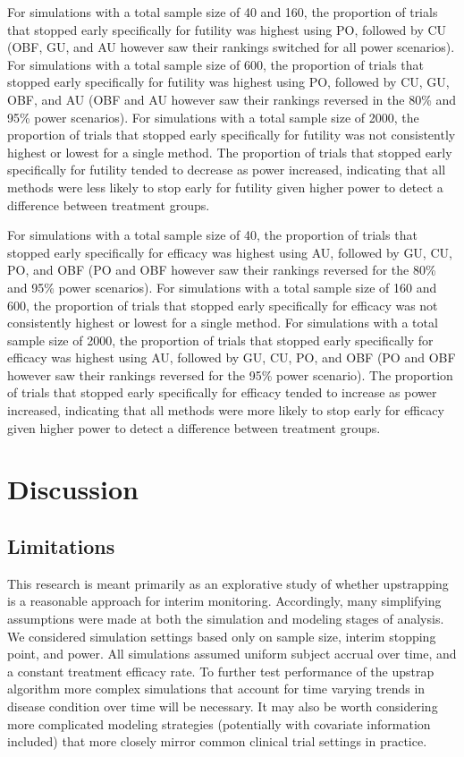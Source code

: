 \documentclass[Afour,sageh,times,square,numbers]{sagej}
\begin{document}
For simulations with a total sample size of 40 and 160, the proportion of trials that stopped early specifically for futility was highest using PO, followed by CU (OBF, GU, and AU however saw their rankings switched for all power scenarios).  For simulations with a total sample size of 600, the proportion of trials that stopped early specifically for futility was highest using PO, followed by CU, GU, OBF, and AU (OBF and AU however saw their rankings reversed in the 80\% and 95\% power scenarios).  For simulations with a total sample size of 2000, the proportion of trials that stopped early specifically for futility was not consistently highest or lowest for a single method.  The proportion of trials that stopped early specifically for futility tended to decrease as power increased, indicating that all methods were less likely to stop early for futility given higher power to detect a difference between treatment groups.

For simulations with a total sample size of 40, the proportion of trials that stopped early specifically for efficacy was highest using AU, followed by GU, CU, PO, and OBF (PO and OBF however saw their rankings reversed for the 80\% and 95\% power scenarios).  For simulations with a total sample size of 160 and 600, the proportion of trials that stopped early specifically for efficacy was not consistently highest or lowest for a single method.  For simulations with a total sample size of 2000, the proportion of trials that stopped early specifically for efficacy was highest using AU, followed by GU, CU, PO, and OBF (PO and OBF however saw their rankings reversed for the 95\% power scenario).  The proportion of trials that stopped early specifically for efficacy tended to increase as power increased, indicating that all methods were more likely to stop early for efficacy given higher power to detect a difference between treatment groups.

\section{Discussion}

\subsection{Limitations}

This research is meant primarily as an explorative study of whether upstrapping is a reasonable approach for interim monitoring.  Accordingly, many simplifying assumptions were made at both the simulation and modeling stages of analysis.  We considered simulation settings based only on sample size, interim stopping point, and power.  All simulations assumed uniform subject accrual over time, and a constant treatment efficacy rate.  To further test performance of the upstrap algorithm more complex simulations that account for time varying trends in disease condition over time will be necessary.  It may also be worth considering more complicated modeling strategies (potentially with covariate information included) that more closely mirror common clinical trial settings in practice.
\end{document}
